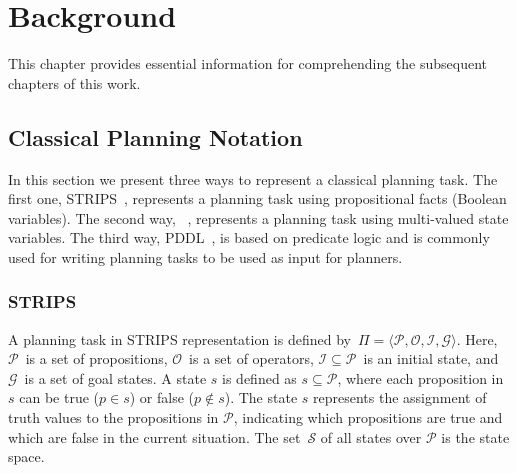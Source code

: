 \documentclass[ppgc,diss,english]{iiufrgs}
\begin{document}
\chapter{Background}
\label{cha:background}
This chapter provides essential information for comprehending the subsequent chapters of this work.

\section{Classical Planning Notation}
\label{sec:background-planning-notation}
In this section we present three ways to represent a classical planning task. The first one, STRIPS~\cite{Fikes.Nilsson/1971}, represents a planning task using propositional facts (Boolean variables). The second way, \sas~\cite{Backstrom.Nebel/1995}, represents a planning task using multi-valued state variables. The third way, PDDL~\cite{Ghallab.etal/1998}, is based on predicate logic and is commonly used for writing planning tasks to be used as input for planners.

\subsection{STRIPS}
\label{sec:background-strips}
A planning task in STRIPS representation is defined by~$\Pi=\langle\mathcal{P},\mathcal{O},\mathcal{I},\mathcal{G}\rangle$. Here, $\mathcal{P}$~is a set of propositions, $\mathcal{O}$~is a set of operators, $\mathcal{I} \subseteq \mathcal{P}$~is an initial state, and $\mathcal{G}$~is a set of goal states. A state $s$ is defined as $s \subseteq \mathcal{P}$, where each proposition in $s$ can be true ($p \in s$) or false ($p \notin s$). The state $s$ represents the assignment of truth values to the propositions in $\mathcal{P}$, indicating which propositions are true and which are false in the current situation. The set~$\mathcal{S}$ of all states over $\mathcal{P}$ is the state space.
\end{document}
